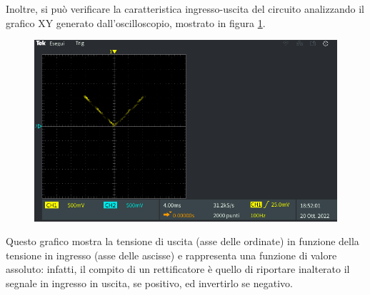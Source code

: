 \noindent
Inoltre, si può verificare la caratteristica ingresso-uscita del circuito analizzando il grafico XY generato dall'oscilloscopio, mostrato in figura \ref{fig:xy_primo_cir}.
\begin{figure}[h]
	\centering
	\includegraphics[width=\linewidth]{./ImageFiles/Laboratorio 3/TEK00000}
	\caption{}
	\label{fig:xy_primo_cir}
\end{figure}
Questo grafico mostra la tensione di uscita (asse delle ordinate) in funzione della tensione in ingresso (asse delle ascisse) e rappresenta una funzione di valore assoluto: infatti, il compito di un rettificatore è quello di riportare inalterato il segnale in ingresso in uscita, se positivo, ed invertirlo se negativo.

